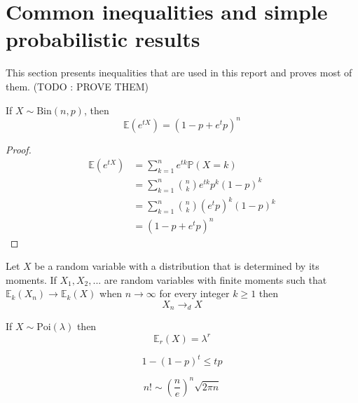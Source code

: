 \section{Common inequalities and simple probabilistic results}
This section presents inequalities that are used in this report and proves most of them. (TODO : PROVE THEM)
\begin{theorem}\label{binMGF}
	If $X \sim \text{Bin}(n, p)$, then 
	\begin{equation}
		\mathbb{E}(e^{tX}) = (1 - p + e^t p)^n
	\end{equation}
\end{theorem}
\begin{proof}
	\begin{align}
		\mathbb{E}(e^{tX}) 	&= \sum_{k=1}^n e^{tk} \mathbb{P}(X =k) \\
					&= \sum_{k=1}^n \binom{n}{k} e^{tk}p^k(1-p)^k  \\
					&= \sum_{k=1}^n \binom{n}{k} (e^tp)^k(1-p)^k  \\
					&=(1 - p + e^t p)^n
	\end{align}
\end{proof}
\begin{theorem}
	Let $X$ be a random variable with a distribution that is determined by its moments. If $X_1, X_2, ...$ are random variables with finite moments such that
	$\mathbb{E}_k(X_n) \longrightarrow \mathbb{E}_k(X)$ when $ n \to \infty$ for every integer $k \geq 1$ then
	\begin{equation}
		X_n \longrightarrow_d X
	\end{equation}
\end{theorem}
\begin{theorem}\label{th:factPois}
	If $X \sim \text{Poi}(\lambda)$ then
	\begin{equation}
		\mathbb{E}_r(X) = \lambda^r
	\end{equation}
\end{theorem}
\begin{theorem}\label{bernoulli}
	\begin{equation}
		1 - (1-p)^t \leq tp
	\end{equation}
\end{theorem}

\begin{theorem}\label{stirling}
	\begin{equation}
		n! \sim (\frac{n}{e})^n \sqrt{2\pi n}
	\end{equation}
\end{theorem}

